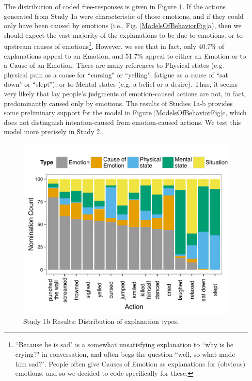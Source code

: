 \documentclass[10pt,letterpaper]{article}
\newcommand{\ndg}[1]{\textcolor{Green}{[ndg: #1]}}
\begin{document}

The distribution of coded free-responses is given in Figure \ref{Study1bResultsFig}. %
If the actions generated from Study 1a were characteristic of those emotions, and if they could only have been caused by emotions (i.e., Fig. \ref{ModelsOfBehaviorFig}a), then we should expect the vast majority of the explanations to be due to emotions, or to upstream causes of emotions\footnote{``Because he is sad" is a somewhat unsatisfying explanation to ``why is he crying?" in conversation, and often begs the question ``well, so what made him sad?". People often give Causes of Emotion as explanations for (obvious) emotions, and so we decided to code specifically for these.}. However, we see that in fact, only 40.7\% of explanations appeal to an Emotion, and 51.7\% appeal to either an Emotion or to a Cause of an Emotion. There are many references to Physical states (e.g. physical pain as a cause for ``cursing" or ``yelling"; fatigue as a cause of ``sat down" or ``slept"), or to Mental states (e.g. a belief or a desire). Thus, it seems very likely that lay people's judgments of emotion-caused actions are not, in fact, predominantly caused only by emotions. 
The results of Studies 1a-b provides some preliminary support for the model in Figure \ref{ModelsOfBehaviorFig}c, which does not distinguish intention-caused from emotion-caused actions. 
We test this model more precisely in Study 2.

\begin{figure}[thb]
\begin{center}\includegraphics[width=1\columnwidth]{images/study1b_codePlot.pdf}\end{center}
\caption{ Study 1b Results: Distribution of explanation types. }
\label{Study1bResultsFig}
\end{figure}
\end{document}
